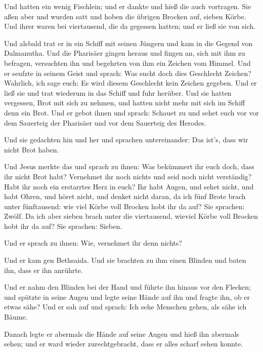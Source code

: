  Und hatten ein wenig Fischlein; und er dankte und hieß
die auch vortragen.  Sie aßen aber und wurden satt und
hoben die übrigen Brocken auf, sieben Körbe.  Und ihrer
waren bei viertausend, die da gegessen hatten; und er ließ sie von sich.

 Und alsbald trat er in ein Schiff mit seinen Jüngern und
kam in die Gegend von Dalmanutha.  Und die Pharisäer
gingen heraus und fingen an, sich mit ihm zu befragen, versuchten ihn
und begehrten von ihm ein Zeichen vom Himmel.  Und er
seufzte in seinem Geist und sprach: Was sucht doch dies Geschlecht
Zeichen? Wahrlich, ich sage euch: Es wird diesem Geschlecht kein Zeichen
gegeben.  Und er ließ sie und trat wiederum in das Schiff
und fuhr herüber.  Und sie hatten vergessen, Brot mit
sich zu nehmen, und hatten nicht mehr mit sich im Schiff denn ein Brot.
 Und er gebot ihnen und sprach: Schauet zu und sehet euch
vor vor dem Sauerteig der Pharisäer und vor dem Sauerteig des Herodes.

 Und sie gedachten hin und her und sprachen
untereinander: Das ist's, dass wir nicht Brot haben.

 Und Jesus merkte das und sprach zu ihnen: Was bekümmert
ihr euch doch, dass ihr nicht Brot habt? Vernehmet ihr noch nichts und
seid noch nicht verständig? Habt ihr noch ein erstarrtes Herz in euch?
 Ihr habt Augen, und sehet nicht, und habt Ohren, und
höret nicht, und denket nicht daran,  da ich fünf Brote
brach unter fünftausend: wie viel Körbe voll Brocken hobt ihr da auf?
Sie sprachen: Zwölf.  Da ich aber sieben brach unter die
viertausend, wieviel Körbe voll Brocken hobt ihr da auf? Sie sprachen:
Sieben.

 Und er sprach zu ihnen: Wie, vernehmet ihr denn nichts?

 Und er kam gen Bethsaida. Und sie brachten zu ihm einen
Blinden und baten ihn, dass er ihn anrührte.

 Und er nahm den Blinden bei der Hand und führte ihn
hinaus vor den Flecken; und spützte in seine Augen und legte seine Hände
auf ihn und fragte ihn, ob er etwas sähe?  Und er sah auf
und sprach: Ich sehe Menschen gehen, als sähe ich Bäume.

 Danach legte er abermals die Hände auf seine Augen und
hieß ihn abermals sehen; und er ward wieder zurechtgebracht, dass er
alles scharf sehen konnte.


